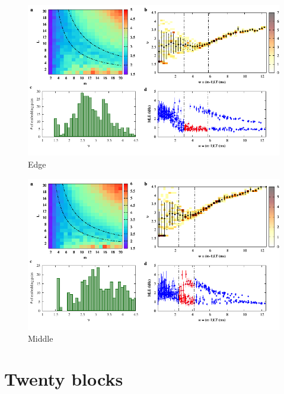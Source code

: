 \begin{figure}[H]
    \centering
    \includegraphics[width=\linewidth]{../15_blocks/edge/2e5_points/plots/chaos_low.pdf}
    \caption{Edge}
    \label{fig:15 blocks chaos}
\end{figure}

\begin{figure}[H]
    \centering
    \includegraphics[width=\linewidth]{../15_blocks/middle/2e5_points/plots/chaos_low.pdf}
    \caption{Middle}
    \label{fig:15 blocks middle chaos}
\end{figure}

\section{Twenty blocks}

